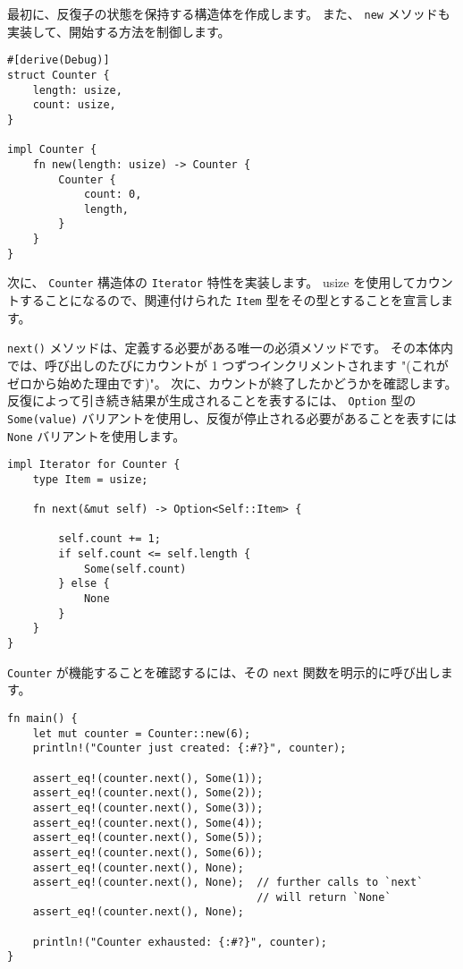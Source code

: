 最初に、反復子の状態を保持する構造体を作成します。 また、 \texttt{new} メソッドも実装して、開始する方法を制御します。


\begin{lstlisting}[numbers=none]
#[derive(Debug)]
struct Counter {
    length: usize,
    count: usize,
}

impl Counter {
    fn new(length: usize) -> Counter {
	    Counter {
	        count: 0,
	        length,
	    }
    }
}
\end{lstlisting}

次に、 \texttt{Counter} 構造体の \texttt{Iterator} 特性を実装します。 usize を使用してカウントすることになるので、関連付けられた \texttt{Item} 型をその型とすることを宣言します。

\texttt{next()} メソッドは、定義する必要がある唯一の必須メソッドです。 その本体内では、呼び出しのたびにカウントが 1 つずつインクリメントされます "(これがゼロから始めた理由です)"。 次に、カウントが終了したかどうかを確認します。 反復によって引き続き結果が生成されることを表するには、 \texttt{Option} 型の \texttt{Some(value)} バリアントを使用し、反復が停止される必要があることを表すには \texttt{None} バリアントを使用します。


\begin{lstlisting}[numbers=none]
impl Iterator for Counter {
    type Item = usize;

    fn next(&mut self) -> Option<Self::Item> {
    
        self.count += 1;
        if self.count <= self.length {
            Some(self.count)
        } else {
            None
        }
    }
}
\end{lstlisting}

\texttt{Counter} が機能することを確認するには、その \texttt{next} 関数を明示的に呼び出します。

\begin{lstlisting}[numbers=none]
fn main() {
    let mut counter = Counter::new(6);
    println!("Counter just created: {:#?}", counter);

    assert_eq!(counter.next(), Some(1));
    assert_eq!(counter.next(), Some(2));
    assert_eq!(counter.next(), Some(3));
    assert_eq!(counter.next(), Some(4));
    assert_eq!(counter.next(), Some(5));
    assert_eq!(counter.next(), Some(6));
    assert_eq!(counter.next(), None);
    assert_eq!(counter.next(), None);  // further calls to `next`
                                       // will return `None`
    assert_eq!(counter.next(), None);

    println!("Counter exhausted: {:#?}", counter);
}
\end{lstlisting}

